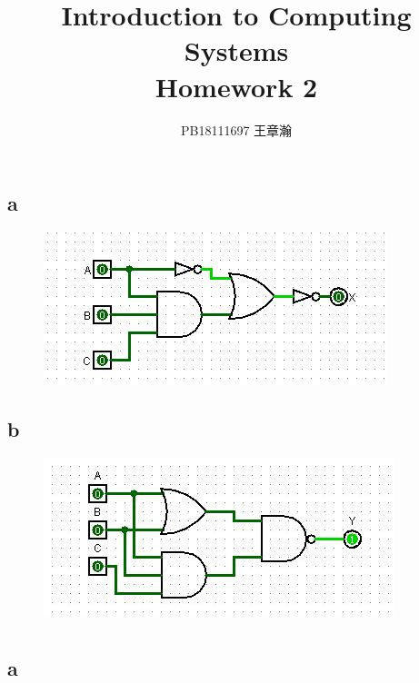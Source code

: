 \documentclass[11pt,a4paper]{article}
\title{Introduction to Computing Systems\\Homework 2}
\author{PB18111697 王章瀚}
\begin{document}
	\maketitle
	\section{}
	\subsection*{a}
	\begin{figure}[H]
		\centering
		\includegraphics[width=1\linewidth]{1_a.jpg}
		\label{1_a}
	\end{figure}

	\subsection*{b}
	\begin{figure}[H]
		\centering
		\includegraphics[width=1\linewidth]{1_b.jpg}
		\label{1_b}
	\end{figure}

	
	\section{}
	\subsection*{a}
\end{document}
